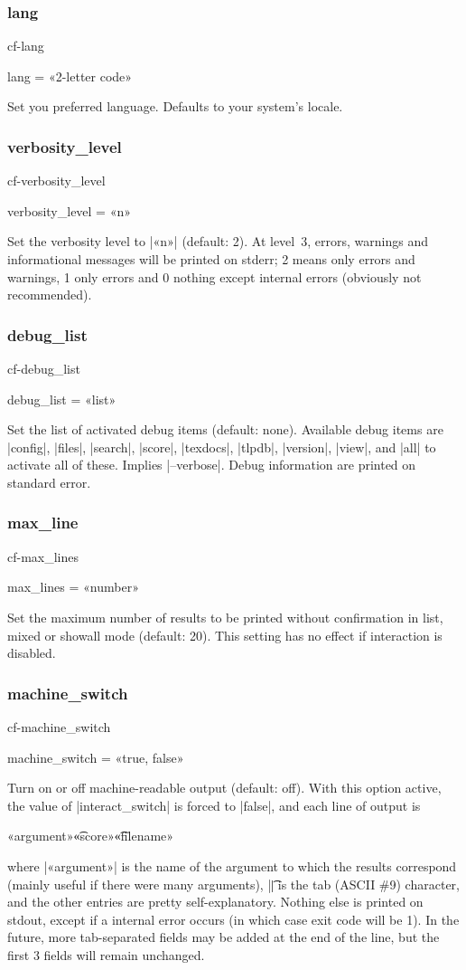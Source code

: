 \documentclass[a4paper, oneside]{scrartcl}
\makeatletter
\newif\ifframed
\newenvironment{cmdsubsub}[2]{%
  \framedfalse \commandes\subsubsection{#1}{#2}%
  }{%
  \endcommandes}
\newenvironment{htcode}{%
  \SaveVerbatim[samepage, gobble=2]{verbmat}%
  }{%
  \endSaveVerbatim
  \par\medskip\noindent\hspace*{\parindent}%
  \BUseVerbatim{verbmat}%
  \par\medskip\@endpetrue}
\makeatother
\begin{document}
\begin{cmdsubsub}{lang}{cf-lang}
  lang = «2-letter code»
\end{cmdsubsub}

Set you preferred language. Defaults to your system's locale.

\begin{cmdsubsub}{verbosity_level}{cf-verbosity_level}
  verbosity_level = «n»
\end{cmdsubsub}

Set the verbosity level to |«n»| (default: 2). At level~3, errors, warnings and
informational messages will be printed on stderr; 2 means only errors and
warnings, 1 only errors and 0 nothing except internal errors (obviously not
recommended).

\begin{cmdsubsub}{debug_list}{cf-debug_list}
  debug_list = «list»
\end{cmdsubsub}

Set the list of activated debug items (default: none). Available debug items
are |config|, |files|, |search|, |score|, |texdocs|, |tlpdb|, |version|,
|view|, and |all| to activate all of these. Implies |--verbose|. Debug
information are printed on standard error.

\begin{cmdsubsub}{max_line}{cf-max_lines}
  max_lines = «number»
\end{cmdsubsub}

Set the maximum number of results to be printed without confirmation in list,
mixed or showall mode (default: 20). This setting has no effect if interaction
is disabled.

\begin{cmdsubsub}{machine_switch}{cf-machine_switch}
  machine_switch = «true, false»
\end{cmdsubsub}

Turn on or off machine-readable output (default: off).  With this option
active, the value of |interact_switch| is forced to |false|, and each line of
output is
\begin{htcode}
  «argument»\t«score»\t«filename»
\end{htcode}
where |«argument»| is the name of the argument to which the results correspond
(mainly useful if there were many arguments), |\t| is the tab (ASCII \#9)
character, and the other entries are pretty self-explanatory. Nothing else is
printed on stdout, except if a internal error occurs (in which case exit code
will be 1). In the future, more tab-separated fields may be added at the end
of the line, but the first 3 fields will remain unchanged.
\end{document}
